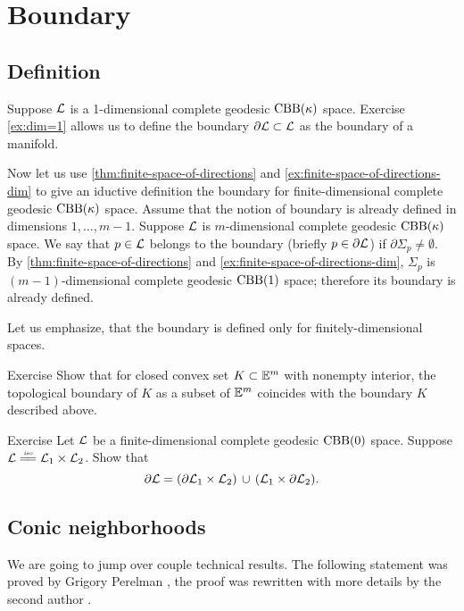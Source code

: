 \chapter{Boundary}

\section{Definition}

Suppose $\mathcal{L}$ is a 1-dimensional complete geodesic $\mathrm{CBB}(\kappa)$ space.
Exercise \ref{ex:dim=1} allows us to define the boundary $\partial\mathcal{L}\subset \mathcal{L}$ as the boundary of a manifold.

Now let us use \ref{thm:finite-space-of-directions} and \ref{ex:finite-space-of-directions-dim} to give an iductive definition the boundary for finite-dimensional complete geodesic $\mathrm{CBB}(\kappa)$ space.
Assume that the notion of boundary is already defined in dimensions $1,\dots,m-1$.
Suppose  $\mathcal{L}$ is $m$-dimensional complete geodesic $\mathrm{CBB}(\kappa)$ space.
We say that $p\in \mathcal{L}$ belongs to the boundary (briefly $p\in \partial \mathcal{L}$) if 
$\partial\Sigma_p\ne\emptyset$.
By \ref{thm:finite-space-of-directions} and \ref{ex:finite-space-of-directions-dim}, $\Sigma_p$ is $(m-1)$-dimensional complete geodesic $\mathrm{CBB}(1)$ space;
therefore its boundary is already defined.

Let us emphasize, that the boundary is defined only for finitely-dimensional spaces.

\begin{thm}{Exercise}
Show that for closed convex set $K\subset \mathbb{E}^m$ with nonempty interior, the topological boundary of $K$ as a subset of $\mathbb{E}^m$ coincides with the boundary $K$ described above.
\end{thm}

\begin{thm}{Exercise}
Let $\mathcal{L}$ be a finite-dimensional complete geodesic $\mathrm{CBB}(0)$ space.
Suppose $\spc{L}\iso\spc{L}_1\times\spc{L}_2$.
Show that 
\[\partial \mathcal{L}=(\partial\mathcal{L}_1\times\mathcal{L}_2)\,\cup\,(\mathcal{L}_1\times\partial\mathcal{L}_2).\]
\end{thm}


\section{Conic neighborhoods}

We are going to jump over couple technical results.
The following statement was proved by Grigory Perelman \cite{perelman1991}, 
the proof was rewritten with more details by the second author \cite{kapovitch}.

